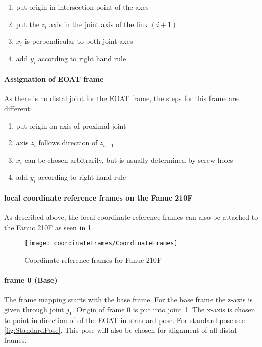\begin{itemize}[wide=\parindent]
		\begin{enumerate}[label=\emph{\alph*)}]
		\item put origin in intersection point of the axes
		\item put the $z_i$ axis in the joint axis of the link $(i+1)$
		\item $x_i$ is perpendicular to both joint axes
		\item add $y_i$ according to right hand rule
	\end{enumerate}
\end{itemize}

\paragraph{Assignation of \ac{EOAT} frame}
As there is no distal joint for the \ac{EOAT} frame, the steps for this frame are different:

\begin{enumerate}[label=\emph{\alph*)}]
	\item put origin on axis of proximal joint 
	\item axis $z_i$ follows direction of $z_{i-1}$
	\item $x_i$ can be chosen arbitrarily, but is usually determined by screw holes
	\item add $y_i$ according to right hand rule
\end{enumerate}

\paragraph{local coordinate reference frames on the Fanuc 210F}

As described above, the local coordinate reference frames can also be attached to the Fanuc 210F as seen in \ref{fig:RefFrame}. 

\begin{figure}[h]
	\texttt{[image: coordinateFrames/CoordinateFrames]}
	\caption{Coordinate reference frames for Fanuc 210F}
	\label{fig:RefFrame}
\end{figure}

\paragraph{frame 0 (Base)}
The frame mapping starts with the base frame. For the base frame the z-axis is given through joint $j_1$. Origin of frame 0 is put into joint 1.
The x-axis is chosen to point in direction of of the \ac{EOAT} in standard pose. For standard pose see \ref{fig:StandardPose}.
This pose will also be chosen for alignment of all distal frames.

